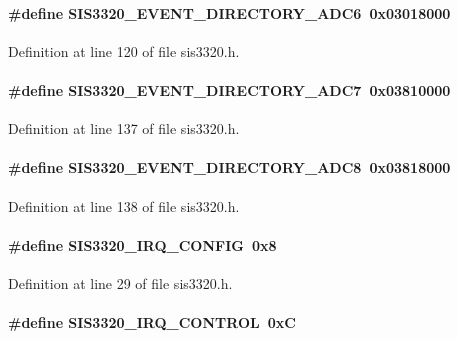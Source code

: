 \paragraph[{SIS3320\_\-EVENT\_\-DIRECTORY\_\-ADC6}]{\setlength{\rightskip}{0pt plus 5cm}\#define SIS3320\_\-EVENT\_\-DIRECTORY\_\-ADC6~0x03018000}\hfill\label{sis3320_8h_ac172b0198eaef0ca0c5433f1b0212e43}


Definition at line 120 of file sis3320.h.
\paragraph[{SIS3320\_\-EVENT\_\-DIRECTORY\_\-ADC7}]{\setlength{\rightskip}{0pt plus 5cm}\#define SIS3320\_\-EVENT\_\-DIRECTORY\_\-ADC7~0x03810000}\hfill\label{sis3320_8h_aa9693581f9a1ddfa76947e6202c4d5a0}


Definition at line 137 of file sis3320.h.
\paragraph[{SIS3320\_\-EVENT\_\-DIRECTORY\_\-ADC8}]{\setlength{\rightskip}{0pt plus 5cm}\#define SIS3320\_\-EVENT\_\-DIRECTORY\_\-ADC8~0x03818000}\hfill\label{sis3320_8h_aea7373601e80689337782be970e6f9cc}


Definition at line 138 of file sis3320.h.
\paragraph[{SIS3320\_\-IRQ\_\-CONFIG}]{\setlength{\rightskip}{0pt plus 5cm}\#define SIS3320\_\-IRQ\_\-CONFIG~0x8}\hfill\label{sis3320_8h_a1ae6442159d6df29563a83e7186bdc35}


Definition at line 29 of file sis3320.h.
\paragraph[{SIS3320\_\-IRQ\_\-CONTROL}]{\setlength{\rightskip}{0pt plus 5cm}\#define SIS3320\_\-IRQ\_\-CONTROL~0xC}\hfill\label{sis3320_8h_aea79f5a1d581850617407894159d5934}


